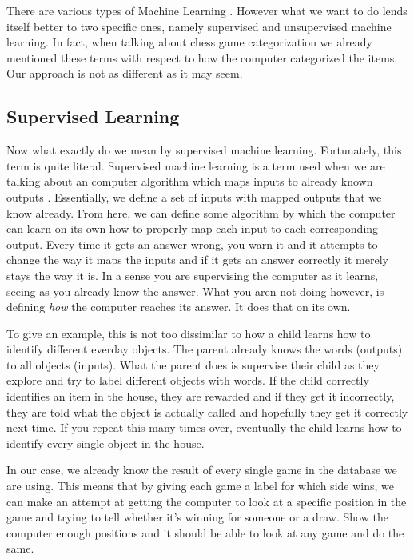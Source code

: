 \documentclass[12pt]{article}
\begin{document}
    There are various types of Machine Learning \cite{mltypes_book}. However what we want to do lends itself better to two specific ones, namely supervised and unsupervised machine learning. In fact, when talking about chess game categorization we already mentioned these terms with respect to how the computer categorized the items. Our approach is not as different as it may seem.

    \subsection{Supervised Learning}

    Now what exactly do we mean by supervised machine learning. Fortunately, this term is quite literal. Supervised machine learning is a term used when we are talking about an computer algorithm which maps inputs to already known outputs \cite{mltypes_book}. Essentially, we define a set of inputs with mapped outputs that we know already. From here, we can define some algorithm by which the computer can learn on its own how to properly map each input to each corresponding output. Every time it gets an answer wrong, you warn it and it attempts to change the way it maps the inputs and if it gets an answer correctly it merely stays the way it is. In a sense you are supervising the computer as it learns, seeing as you already know the answer. What you aren not doing however, is defining \textit{how} the computer reaches its answer. It does that on its own.
    
    To give an example, this is not too dissimilar to how a child learns how to identify different everday objects. The parent already knows the words (outputs) to all objects (inputs). What the parent does is supervise their child as they explore and try to label different objects with words. If the child correctly identifies an item in the house, they are rewarded and if they get it incorrectly, they are told what the object is actually called and hopefully they get it correctly next time. If you repeat this many times over, eventually the child learns how to identify every single object in the house. 

    In our case, we already know the result of every single game in the database we are using. This means that by giving each game a label for which side wins, we can make an attempt at getting the computer to look at a specific position in the game and trying to tell whether it's winning for someone or a draw. Show the computer enough positions and it should be able to look at any game and do the same.
\end{document}
